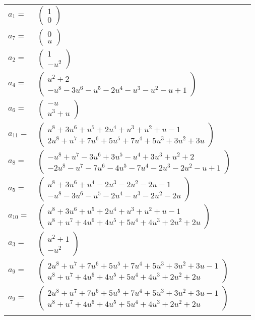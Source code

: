 \documentclass[1p]{elsarticle_modified}
\theoremstyle{definition}
\begin{document}
\begin{tabular}{m{7pt} m{180pt} m{7pt} m{180pt} }
\flushright $a_{1}=$&$\begin{pmatrix}1\\0\end{pmatrix}$ \\
\flushright $a_{7}=$&$\begin{pmatrix}0\\u\end{pmatrix}$ \\
\flushright $a_{2}=$&$\begin{pmatrix}1\\- u^2\end{pmatrix}$ \\
\flushright $a_{4}=$&$\begin{pmatrix}u^2+2\\- u^8-3 u^6- u^5-2 u^4- u^3- u^2- u+1\end{pmatrix}$ \\
\flushright $a_{6}=$&$\begin{pmatrix}- u\\u^3+u\end{pmatrix}$ \\
\flushright $a_{11}=$&$\begin{pmatrix}u^8+3 u^6+u^5+2 u^4+u^3+u^2+u-1\\2 u^8+u^7+7 u^6+5 u^5+7 u^4+5 u^3+3 u^2+3 u\end{pmatrix}$ \\
\flushright $a_{8}=$&$\begin{pmatrix}- u^8+u^7-3 u^6+3 u^5- u^4+3 u^3+u^2+2\\-2 u^8- u^7-7 u^6-4 u^5-7 u^4-2 u^3-2 u^2- u+1\end{pmatrix}$ \\
\flushright $a_{5}=$&$\begin{pmatrix}u^8+3 u^6+u^4-2 u^3-2 u^2-2 u-1\\- u^8-3 u^6- u^5-2 u^4- u^3-2 u^2-2 u\end{pmatrix}$ \\
\flushright $a_{10}=$&$\begin{pmatrix}u^8+3 u^6+u^5+2 u^4+u^3+u^2+u-1\\u^8+u^7+4 u^6+4 u^5+5 u^4+4 u^3+2 u^2+2 u\end{pmatrix}$ \\
\flushright $a_{3}=$&$\begin{pmatrix}u^2+1\\- u^2\end{pmatrix}$ \\
\flushright $a_{9}=$&$\begin{pmatrix}2 u^8+u^7+7 u^6+5 u^5+7 u^4+5 u^3+3 u^2+3 u-1\\u^8+u^7+4 u^6+4 u^5+5 u^4+4 u^3+2 u^2+2 u\end{pmatrix}$\\ \flushright $a_{9}=$&$\begin{pmatrix}2 u^8+u^7+7 u^6+5 u^5+7 u^4+5 u^3+3 u^2+3 u-1\\u^8+u^7+4 u^6+4 u^5+5 u^4+4 u^3+2 u^2+2 u\end{pmatrix}$\\&\end{tabular}
\end{document}
